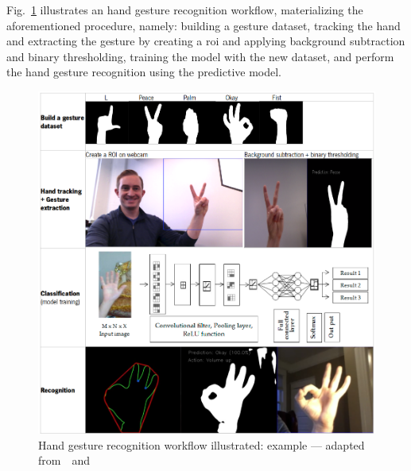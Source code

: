 Fig.~\ref{fig:hand-gesture-procedure-simplified} illustrates an hand gesture
recognition workflow, materializing the aforementioned procedure, namely:
building a gesture dataset, tracking the hand and extracting the gesture by
creating a \gls{roi} and applying background subtraction and binary
thresholding, training the model with the new dataset, and perform the hand
gesture recognition using the predictive model.
%
\begin{figure}[!hbt]
\centering
    \includegraphics[width=1.0\textwidth]{./img/hand-gesture-procedure-simplified.png}
  \caption{Hand gesture recognition workflow illustrated: example --- adapted from~\cite{trainingNN4GestureDetection}~and~\cite{oudah2020hand}}%
\label{fig:hand-gesture-procedure-simplified}
\end{figure}


%
%
%



